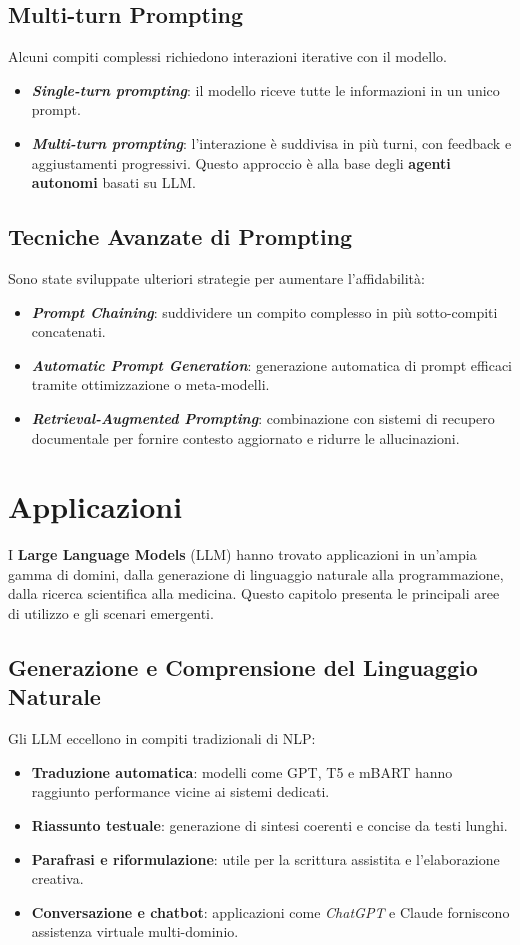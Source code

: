 \subsection{Multi-turn Prompting}
Alcuni compiti complessi richiedono interazioni iterative con il modello.
\begin{itemize}
    \item \textbf{\textit{Single-turn prompting}}: il modello riceve tutte le informazioni in un unico prompt.
    \item \textbf{\textit{Multi-turn prompting}}: l'interazione è suddivisa in più turni, 
    con feedback e aggiustamenti progressivi. Questo approccio è alla base degli \textbf{agenti autonomi} basati su LLM.
\end{itemize}

\subsection{Tecniche Avanzate di Prompting}
Sono state sviluppate ulteriori strategie per aumentare l'affidabilità:
\begin{itemize}
    \item \textbf{\textit{Prompt Chaining}}: suddividere un compito complesso in più sotto-compiti concatenati.
    \item \textbf{\textit{Automatic Prompt Generation}}: generazione automatica di prompt efficaci 
    tramite ottimizzazione o meta-modelli.
    \item \textbf{\textit{Retrieval-Augmented Prompting}}: combinazione con sistemi di recupero documentale 
    per fornire contesto aggiornato e ridurre le allucinazioni.
\end{itemize}

\newpage
\section{Applicazioni}
I \textbf{Large Language Models} (LLM) hanno trovato applicazioni in un'ampia gamma di domini, 
dalla generazione di linguaggio naturale alla programmazione, 
dalla ricerca scientifica alla medicina. 
Questo capitolo presenta le principali aree di utilizzo e gli scenari emergenti.

\subsection{Generazione e Comprensione del Linguaggio Naturale}
Gli LLM eccellono in compiti tradizionali di NLP:
\begin{itemize}
    \item \textbf{Traduzione automatica}: modelli come GPT, T5 e mBART hanno raggiunto 
    performance vicine ai sistemi dedicati.
    \item \textbf{Riassunto testuale}: generazione di sintesi coerenti e concise da testi lunghi.
    \item \textbf{Parafrasi e riformulazione}: utile per la scrittura assistita e l'elaborazione creativa.
    \item \textbf{Conversazione e chatbot}: applicazioni come \textit{ChatGPT} e Claude 
    forniscono assistenza virtuale multi-dominio.
\end{itemize}

